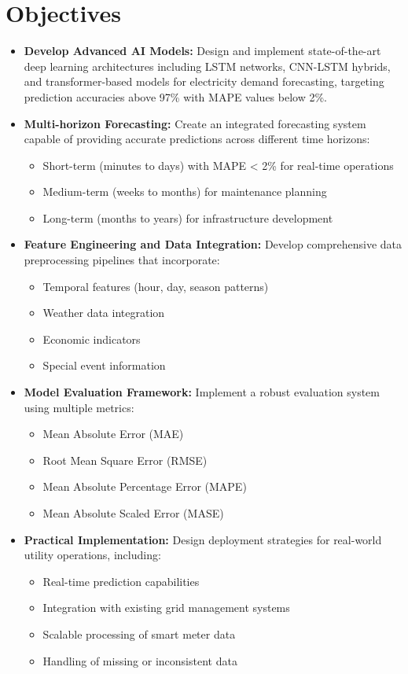 \documentclass[12pt,a4paper]{report}
\begin{document}
\section{Objectives}
\begin{itemize}
\item \textbf{Develop Advanced AI Models:} Design and implement state-of-the-art deep learning architectures including LSTM networks, CNN-LSTM hybrids, and transformer-based models for electricity demand forecasting, targeting prediction accuracies above 97\% with MAPE values below 2\%.

\item \textbf{Multi-horizon Forecasting:} Create an integrated forecasting system capable of providing accurate predictions across different time horizons:
  \begin{itemize}
    \item Short-term (minutes to days) with MAPE < 2\% for real-time operations
    \item Medium-term (weeks to months) for maintenance planning
    \item Long-term (months to years) for infrastructure development
  \end{itemize}

\item \textbf{Feature Engineering and Data Integration:} Develop comprehensive data preprocessing pipelines that incorporate:
  \begin{itemize}
    \item Temporal features (hour, day, season patterns)
    \item Weather data integration
    \item Economic indicators
    \item Special event information
  \end{itemize}

\item \textbf{Model Evaluation Framework:} Implement a robust evaluation system using multiple metrics:
  \begin{itemize}
    \item Mean Absolute Error (MAE)
    \item Root Mean Square Error (RMSE)
    \item Mean Absolute Percentage Error (MAPE)
    \item Mean Absolute Scaled Error (MASE)
  \end{itemize}

\item \textbf{Practical Implementation:} Design deployment strategies for real-world utility operations, including:
  \begin{itemize}
    \item Real-time prediction capabilities
    \item Integration with existing grid management systems
    \item Scalable processing of smart meter data
    \item Handling of missing or inconsistent data
  \end{itemize}
\end{itemize}
\end{document}
